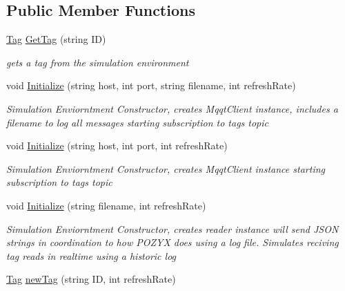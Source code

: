\subsection*{Public Member Functions}
\begin{DoxyCompactItemize}
\item 
\hyperlink{class_pozyx_positioner_1_1_framework_1_1_tag}{Tag} \hyperlink{class_pozyx_positioner_1_1_framework_1_1_sim_environment_a2163b3c6c4794224ceba0e5279b7ee8e}{Get\+Tag} (string ID)
\begin{DoxyCompactList}\small\item\em gets a tag from the simulation environment \end{DoxyCompactList}\item 
void \hyperlink{class_pozyx_positioner_1_1_framework_1_1_sim_environment_ad559e17b83e87b9121d3ffd9c08e10b4}{Initialize} (string host, int port, string filename, int refresh\+Rate)
\begin{DoxyCompactList}\small\item\em Simulation Enviorntment Constructor, creates Mqqt\+Client instance, includes a filename to log all messages starting subscription to tags topic \end{DoxyCompactList}\item 
void \hyperlink{class_pozyx_positioner_1_1_framework_1_1_sim_environment_a15a540048be983d1a0ae9983272992be}{Initialize} (string host, int port, int refresh\+Rate)
\begin{DoxyCompactList}\small\item\em Simulation Enviorntment Constructor, creates Mqqt\+Client instance starting subscription to tags topic \end{DoxyCompactList}\item 
void \hyperlink{class_pozyx_positioner_1_1_framework_1_1_sim_environment_a7ede2b3fa6a7af26549b316f1649ba21}{Initialize} (string filename, int refresh\+Rate)
\begin{DoxyCompactList}\small\item\em Simulation Enviorntment Constructor, creates reader instance will send J\+S\+ON strings in coordination to how P\+O\+Z\+YX does using a log file. Simulates reciving tag reads in realtime using a historic log \end{DoxyCompactList}\item 
\hyperlink{class_pozyx_positioner_1_1_framework_1_1_tag}{Tag} \hyperlink{class_pozyx_positioner_1_1_framework_1_1_sim_environment_ad523ae9a258ae7b68d7f966be92ff3bb}{new\+Tag} (string ID, int refresh\+Rate)

\end{DoxyCompactItemize}
